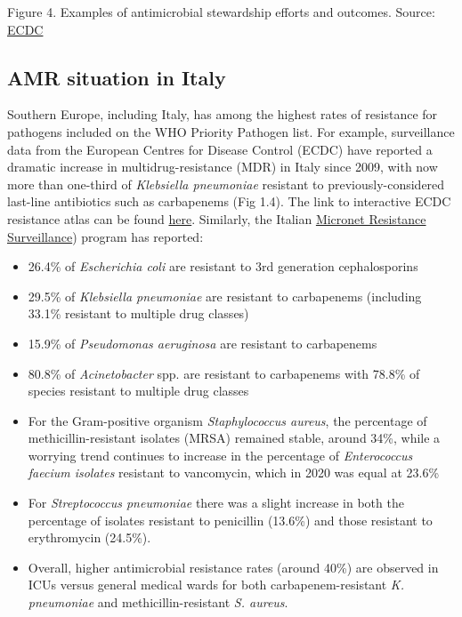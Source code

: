 \documentclass[]{tufte-handout}
\providecommand{\tightlist}{%
  \setlength{\itemsep}{0pt}\setlength{\parskip}{0pt}}
\begin{document}
Figure 4. Examples of antimicrobial stewardship efforts and outcomes.
Source:
\href{https://antibiotic.ecdc.europa.eu/en/infographics-about-antibiotic-stewardship-programmes}{ECDC}

\hypertarget{amr-situation-in-italy}{%
\subsection*{AMR situation in Italy}\label{amr-situation-in-italy}}

Southern Europe, including Italy, has among the highest rates of
resistance for pathogens included on the WHO Priority Pathogen list. For
example, surveillance data from the European Centres for Disease Control
(ECDC) have reported a dramatic increase in multidrug-resistance (MDR)
in Italy since 2009, with now more than one-third of \emph{Klebsiella
pneumoniae} resistant to previously-considered last-line antibiotics
such as carbapenems (Fig 1.4). The link to interactive ECDC resistance
atlas can be found
\href{https://atlas.ecdc.europa.eu/public/index.aspx?Dataset=27\&HealthTopic=4}{here}.
Similarly, the Italian
\href{https://www.epicentro.iss.it/antibiotico-resistenza/epidemiologia-italia}{Micronet
Resistance Surveillance}) program has reported:

\begin{itemize}
\tightlist
\item
  26.4\% of \emph{Escherichia coli} are resistant to 3rd generation
  cephalosporins
\item
  29.5\% of \emph{Klebsiella pneumoniae} are resistant to carbapenems
  (including 33.1\% resistant to multiple drug classes)
\item
  15.9\% of \emph{Pseudomonas aeruginosa} are resistant to carbapenems
\item
  80.8\% of \emph{Acinetobacter} spp. are resistant to carbapenems with
  78.8\% of species resistant to multiple drug classes
\item
  For the Gram-positive organism \emph{Staphylococcus aureus}, the
  percentage of methicillin-resistant isolates (MRSA) remained stable,
  around 34\%, while a worrying trend continues to increase in the
  percentage of \emph{Enterococcus faecium isolates} resistant to
  vancomycin, which in 2020 was equal at 23.6\%
\item
  For \emph{Streptococcus pneumoniae} there was a slight increase in
  both the percentage of isolates resistant to penicillin (13.6\%) and
  those resistant to erythromycin (24.5\%).
\item
  Overall, higher antimicrobial resistance rates (around 40\%) are
  observed in ICUs versus general medical wards for both
  carbapenem-resistant \emph{K. pneumoniae} and methicillin-resistant
  \emph{S. aureus}.
\end{itemize}
\end{document}
